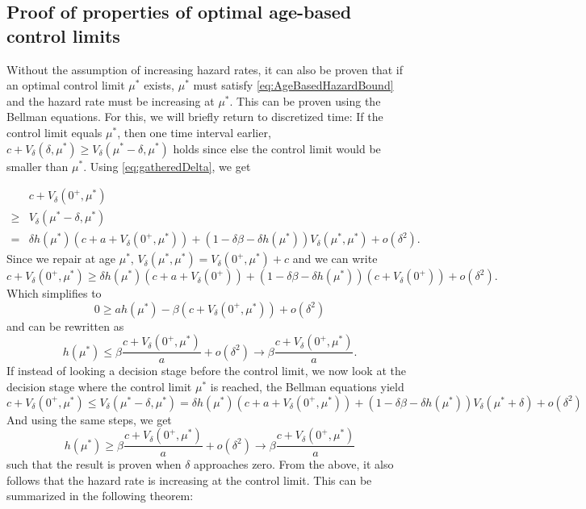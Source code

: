 \documentclass[a4paper]{thesis}
\theoremstyle{definition}
\providecommand{\DIFaddtex}[1]{{\protect\color{blue}\uwave{#1}}} %
\providecommand{\DIFaddend}{} %
\providecommand{\DIFadd}[1]{\texorpdfstring{\DIFaddtex{#1}}{#1}} %
\DeclareRobustCommand{\DIFaddend}{\DIFOaddend \let\includegraphics\DIFOincludegraphics} %
\begin{document}
\begin{appendices}
		\DIFaddend \chapter{Proof of properties of optimal age-based control limits}\label{AppendixAgeBasedControlLimit}
		Without the assumption of increasing hazard rates, it can also be proven that if an optimal control limit $\mu^*$ exists, $\mu^*$ must satisfy \eqref{eq:AgeBasedHazardBound} and the hazard rate must be increasing at $\mu^*$.
		This can be proven using the Bellman equations.
		For this, we will briefly return to discretized time:
		If the control limit equals $\mu^*$, then one time interval earlier, $c+V_\delta(\delta,\mu^*)\geq V_\delta(\mu^*-\delta,\mu^*)$ holds since else the control limit would be smaller than $\mu^*$.
		Using \eqref{eq:gatheredDelta}, we get
		
		\[\begin{split}
		&c+V_\delta(0^+,\mu^*)\\
		\geq& V_\delta(\mu^*-\delta,\mu^*)\\
		=&\delta h(\mu^*)(c+a+ V_\delta(0^+,\mu^*))+(1-\delta\beta-\delta h(\mu^*)) V_\delta(\mu^*,\mu^*)+o(\delta^2).
		\end{split}
		\]
		Since we repair at age $\mu^*$, $V_\delta(\mu^*,\mu^*)=V_\delta(0^+,\mu^*)+c$ and we can write
		$$
		c+V_\delta(0^+,\mu^*)\geq \delta h(\mu^*)(c+a+ V_\delta(0^+))+(1-\delta\beta-\delta h(\mu^*)) (c+V_\delta(0^+))+o(\delta^2).
		$$
		Which simplifies to
		$$
		0\geq ah(\mu^*)-\beta (c+V_\delta(0^+,\mu^*))+o(\delta^2)
		$$
		and can be rewritten as
		$$
		h(\mu^*)\leq \beta\frac{c+V_\delta(0^+,\mu^*)}{a} +o(\delta^2)\rightarrow\beta\frac{c+V_\delta(0^+,\mu^*)}{a}.
		$$
		If instead of looking a decision stage before the control limit, we now look at the decision stage where the control limit $\mu^*$ is reached, the Bellman equations yield
		$$
		c+V_\delta(0^+,\mu^*)\leq V_\delta(\mu^*-\delta,\mu^*)=\delta h(\mu^*)(c+a+ V_\delta(0^+,\mu^*))+(1-\delta\beta-\delta h(\mu^*)) V_\delta(\mu^*+\delta)+o(\delta^2)
		$$
		And using the same steps, we get
		$$
		h(\mu^*)\geq \beta\frac{c+V_\delta(0^+,\mu^*)}{a} +o(\delta^2)\rightarrow\beta\frac{c+V_\delta(0^+,\mu^*)}{a}
		$$
		such that the result is proven when $\delta$ approaches zero.
		From the above, it also follows that the hazard rate is increasing at the control limit.
		This can be summarized in the following theorem:
		

\end{appendices}
\end{document}
